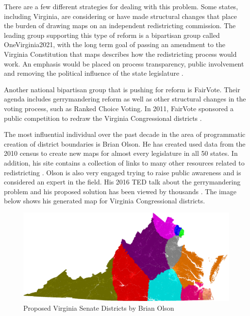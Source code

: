 \documentclass[11pt]{article}
\begin{document}
There are a few different strategies for dealing with this problem. Some states, including Virginia, are considering or have made structural changes that place the burden of drawing maps on an independent redistricting commission. The leading group supporting this type of reform is a bipartisan group called OneVirginia2021, with the long term goal of passing an amendment to the Virginia Constitution that maps describes how the redistricting process would work. An emphasis would be placed on process transparency, public involvement and removing the political influence of the state legislature \cite{OneVirginia2021Page}.

\medskip

Another national bipartisan group that is pushing for reform is FairVote. Their agenda includes gerrymandering reform as well as other structural changes in the voting process, such as Ranked Choice Voting. In 2011, FairVote sponsored a public competition to redraw the Virginia Congressional districts \cite{FairVotePage}.

\medskip

The most influential individual over the past decade in the area of programmatic creation of district boundaries is Brian Olson. He has created used data from the 2010 census to create new maps for almost every legislature in all 50 states. In addition, his site contains a collection of links to many other resources related to redistricting \cite{BrianOlsonRedistricting}. Olson is also very engaged trying to raise public awareness and is considered an expert in the field. His 2016 TED talk about the gerrymandering problem and his proposed solution has been viewed by thousands \cite{BrianOlsonTedTalk}. The image below shows his generated map for Virginia Congressional districts.

\begin{figure}[H]
	\centering
	\includegraphics[width=\textwidth]{OlsonMap11}
	\caption{Proposed Virginia Senate Districts by Brian Olson}
	\label{fig:Olson_11_CD}
\end{figure}
\end{document}
